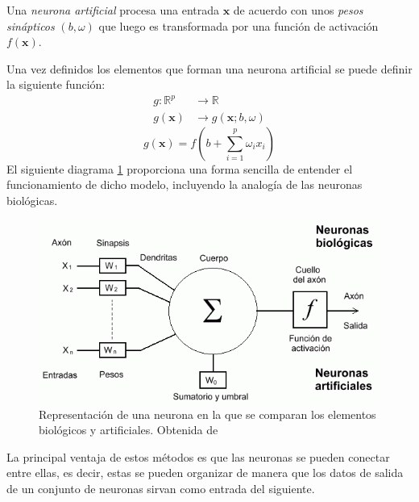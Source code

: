 \begin{defi}
Una \emph{neurona artificial} procesa una entrada $\textbf{x}$ de acuerdo con unos \emph{pesos sinápticos} $(b,\omega)$ que luego es transformada por una función de activación $f(\mathbf{x})$.

\noindent Una  vez definidos los elementos que forman una neurona artificial se puede definir la siguiente función:
\begin{equation}
\begin{split}
g:\mathbb{R}^p &\longrightarrow \mathbb{R}\\
g(\textbf{x})&\longrightarrow g(\textbf{x};b,\omega)
\end{split}
\end{equation}
\begin{equation}
g(\textbf{x})=f\left(b+\sum_{i=1}^p \omega_i x_i\right)
\end{equation}
El siguiente diagrama \ref{fig:neurona-biológica} proporciona una forma sencilla de entender el funcionamiento de dicho modelo, incluyendo la analogía de las neuronas biológicas. 
\end{defi}
\begin{figure}
\begin{center}
\includegraphics[scale=0.6]{Documentos Extra/Imagenes/neurona.png}
\caption{Representación de una neurona en la que se comparan los elementos biológicos y artificiales. Obtenida de \cite{Requena}}
\label{fig:neurona-biológica}
\end{center}
\end{figure}


\noindent La principal ventaja de estos métodos es que las neuronas se pueden conectar entre ellas, es decir, estas se pueden organizar de manera que los datos de salida de un conjunto de neuronas sirvan como  entrada del siguiente.

